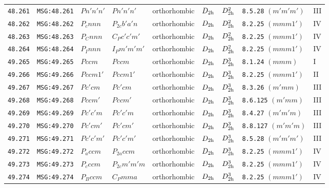 \documentclass[fleqn,10pt]{jsarticle}
\begin{document}
\begin{center}
\begin{longtable}{lllllllll}
\texttt{48.261} & \texttt{MSG:48.261} & $Pn'n'n'$ & $Pn'n'n'$ & orthorhombic & $D_{\rm 2h}$ & $D_{\rm 2h}^{2}$ & \texttt{8.5.28} $(m'm'm')$ & III \\
\texttt{48.262} & \texttt{MSG:48.262} & $P_{c}nnn$ & $P_{2c}b'a'n$ & orthorhombic & $D_{\rm 2h}$ & $D_{\rm 2h}^{2}$ & \texttt{8.2.25} $(mmm1')$ & IV \\
\texttt{48.263} & \texttt{MSG:48.263} & $P_{C}nnn$ & $C_{P}c'c'm'$ & orthorhombic & $D_{\rm 2h}$ & $D_{\rm 2h}^{2}$ & \texttt{8.2.25} $(mmm1')$ & IV \\
\texttt{48.264} & \texttt{MSG:48.264} & $P_{I}nnn$ & $I_{P}m'm'm'$ & orthorhombic & $D_{\rm 2h}$ & $D_{\rm 2h}^{2}$ & \texttt{8.2.25} $(mmm1')$ & IV \\ \hline
\texttt{49.265} & \texttt{MSG:49.265} & $Pccm$ & $Pccm$ & orthorhombic & $D_{\rm 2h}$ & $D_{\rm 2h}^{3}$ & \texttt{8.1.24} $(mmm)$ & I \\
\texttt{49.266} & \texttt{MSG:49.266} & $Pccm1'$ & $Pccm1'$ & orthorhombic & $D_{\rm 2h}$ & $D_{\rm 2h}^{3}$ & \texttt{8.2.25} $(mmm1')$ & II \\
\texttt{49.267} & \texttt{MSG:49.267} & $Pc'cm$ & $Pc'cm$ & orthorhombic & $D_{\rm 2h}$ & $D_{\rm 2h}^{3}$ & \texttt{8.3.26} $(m'mm)$ & III \\
\texttt{49.268} & \texttt{MSG:49.268} & $Pccm'$ & $Pccm'$ & orthorhombic & $D_{\rm 2h}$ & $D_{\rm 2h}^{3}$ & \texttt{8.6.125} $(m'mm)$ & III \\
\texttt{49.269} & \texttt{MSG:49.269} & $Pc'c'm$ & $Pc'c'm$ & orthorhombic & $D_{\rm 2h}$ & $D_{\rm 2h}^{3}$ & \texttt{8.4.27} $(m'm'm)$ & III \\
\texttt{49.270} & \texttt{MSG:49.270} & $Pc'cm'$ & $Pc'cm'$ & orthorhombic & $D_{\rm 2h}$ & $D_{\rm 2h}^{3}$ & \texttt{8.8.127} $(m'm'm)$ & III \\
\texttt{49.271} & \texttt{MSG:49.271} & $Pc'c'm'$ & $Pc'c'm'$ & orthorhombic & $D_{\rm 2h}$ & $D_{\rm 2h}^{3}$ & \texttt{8.5.28} $(m'm'm')$ & III \\
\texttt{49.272} & \texttt{MSG:49.272} & $P_{a}ccm$ & $P_{2a}ccm$ & orthorhombic & $D_{\rm 2h}$ & $D_{\rm 2h}^{3}$ & \texttt{8.2.25} $(mmm1')$ & IV \\
\texttt{49.273} & \texttt{MSG:49.273} & $P_{c}ccm$ & $P_{2c}m'm'm$ & orthorhombic & $D_{\rm 2h}$ & $D_{\rm 2h}^{3}$ & \texttt{8.2.25} $(mmm1')$ & IV \\
\texttt{49.274} & \texttt{MSG:49.274} & $P_{B}ccm$ & $C_{P}mma$ & orthorhombic & $D_{\rm 2h}$ & $D_{\rm 2h}^{3}$ & \texttt{8.2.25} $(mmm1')$ & IV \\

\end{longtable}
\end{center}
\end{document}
